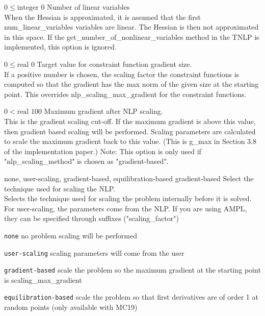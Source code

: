 %
{$0\leq\textrm{integer}$}%
{$0$}%
{Number of linear variables\\
When the Hessian is approximated, it is assumed that the first num\_linear\_variables variables are linear.  The Hessian is then not approximated in this space.  If the get\_number\_of\_nonlinear\_variables method in the TNLP is implemented, this option is ignored.}%
{}

%
{$0\leq\textrm{real}$}%
{$0$}%
{Target value for constraint function gradient size.\\
If a positive number is chosen, the scaling factor the constraint functions is computed so that the gradient has the max norm of the given size at the starting point.  This overrides nlp\_scaling\_max\_gradient for the constraint functions.}%
{}

%
{$0<\textrm{real}$}%
{$100$}%
{Maximum gradient after NLP scaling.\\
This is the gradient scaling cut-off. If the maximum gradient is above this value, then gradient based scaling will be performed. Scaling parameters are calculated to scale the maximum gradient back to this value. (This is g\_max in Section 3.8 of the implementation paper.) Note: This option is only used if "nlp\_scaling\_method" is chosen as "gradient-based".}%
{}

%
{\ttfamily none, user-scaling, gradient-based, equilibration-based}%
{gradient-based}%
{Select the technique used for scaling the NLP.\\
Selects the technique used for scaling the problem internally before it is solved. For user-scaling, the parameters come from the NLP. If you are using AMPL, they can be specified through suffixes ("scaling\_factor")}%
{\begin{list}{}{
\setlength{\parsep}{0em}
\setlength{\leftmargin}{5ex}
\setlength{\labelwidth}{2ex}
\setlength{\itemindent}{0ex}
\setlength{\topsep}{0pt}}
\item[\texttt{none}] no problem scaling will be performed
\item[\texttt{user-scaling}] scaling parameters will come from the user
\item[\texttt{gradient-based}] scale the problem so the maximum gradient at the starting point is scaling\_max\_gradient
\item[\texttt{equilibration-based}] scale the problem so that first derivatives are of order 1 at random points (only available with MC19)
\end{list}
}

